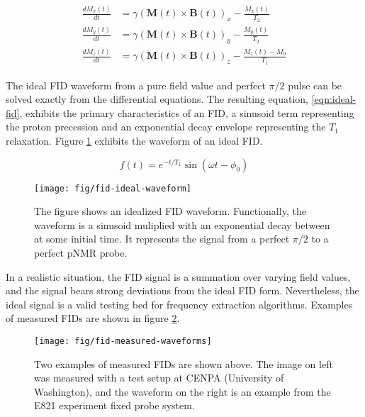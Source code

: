 \begin{align}
\begin{split}
\label{eqn:bloch}
\frac{dM_x(t)}{dt} & = \gamma (\mathbf{M}(t) \times \mathbf{B}(t))_x - \frac{M_x(t)}{T_2} \\
\frac{dM_y(t)}{dt} & = \gamma (\mathbf{M}(t)\times \mathbf{B}(t))_y - \frac{M_y(t)}{T_2} \\
\frac{dM_z(t)}{dt} & = \gamma (\mathbf{M}(t) \times \mathbf{B}(t))_z - \frac{M_z(t) - M_0}{T_1}
\end{split} 
\end{align}

The ideal FID waveform from a pure field value and perfect $\pi/2$ pulse can be solved exactly from the differential equations.  The resulting equation, \ref{eqn:ideal-fid}, exhibits the primary characteristics of an FID, a sinusoid term representing the proton precession and an exponential decay envelope representing the $T_1$ relaxation.  Figure \ref{fig:fid-ideal-waveform} exhibits the waveform of an ideal FID.

\begin{equation}
f(t) = e^{-t/T_1} \sin(\omega t - \phi_0)
\label{eqn:ideal-fid}
\end{equation}

\begin{figure}
\label{fig:fid-ideal-waveform}
\centering
\texttt{[image: fig/fid-ideal-waveform]}
\caption{The figure shows an idealized FID waveform. Functionally, the waveform is a sinusoid muliplied with an exponential decay between at some initial time.  It represents the signal from a perfect $\pi/2$ to a perfect pNMR probe.}
\end{figure}

In a realistic situation, the FID signal is a summation over varying field values, and the signal bears strong deviations from the ideal FID form.  Nevertheless, the ideal signal is a valid testing bed for frequency extraction algorithms.  Examples of measured FIDs are shown in figure \ref{fig:fid-measured-waveforms}.

\begin{figure}
\label{fig:fid-measured-waveforms}
\centering
\texttt{[image: fig/fid-measured-waveforms]}
\caption{Two examples of measured FIDs are shown above. The image on left was measured with a test setup at CENPA (University of Washington), and the waveform on the right is an example from the E821 experiment fixed probe system.}
\end{figure}

